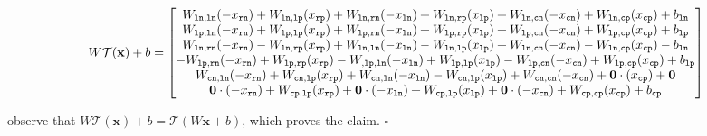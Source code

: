 \documentclass{article}
\begin{document}
$$
W\mathcal{T}(\mathbf{x}) +b = 
\begin{bmatrix}
W_{\tt ln,ln} (-x_{\tt rn}) + W_{\tt ln,lp} (x_{\tt rp}) + W_{\tt ln,rn} (-x_{\tt ln}) + W_{\tt ln,rp} (x_{\tt lp}) + W_{\tt ln,cn} (-x_{\tt cn}) + W_{\tt ln,cp} (x_{\tt cp}) + b_{\tt ln}\\ 
W_{\tt lp,ln} (-x_{\tt rn}) + W_{\tt lp,lp} (x_{\tt rp}) + W_{\tt lp,rn} (-x_{\tt ln}) + W_{\tt lp,rp} (x_{\tt lp}) + W_{\tt lp,cn} (-x_{\tt cn}) + W_{\tt lp,cp} (x_{\tt cp}) + b_{\tt lp}\\ 
W_{\tt ln, rn} (-x_{\tt rn}) - W_{\tt ln, rp} (x_{\tt rp}) + W_{\tt ln,ln} (-x_{\tt ln}) - W_{\tt ln,lp} (x_{\tt lp}) + W_{\tt ln,cn} (-x_{\tt cn}) - W_{\tt ln, cp} (x_{\tt cp}) - b_{\tt ln}\\
-W_{\tt lp,rn} (-x_{\tt rn}) + W_{\tt lp,rp} (x_{\tt rp}) - W_{\tt, lp,ln} (-x_{\tt ln}) + W_{\tt lp,lp} (x_{\tt lp}) - W_{\tt lp, cn} (-x_{\tt cn}) + W_{\tt lp,cp} (x_{\tt cp}) + b_{\tt lp}\\ 
W_{\tt cn,ln} (-x_{\tt rn}) + W_{\tt cn, lp} (x_{\tt rp}) + W_{\tt cn,ln} (-x_{\tt ln}) - W_{\tt cn, lp} (x_{\tt lp}) + W_{\tt cn,cn} (-x_{\tt cn}) + \mathbf{0} \cdot (x_{\tt cp}) + \mathbf{0}\\
 \mathbf{0} \cdot (-x_{\tt rn}) + W_{\tt cp, lp} (x_{\tt rp}) + \mathbf{0} \cdot (-x_{\tt ln}) + W_{\tt cp,lp} (x_{\tt lp}) + \mathbf{0} \cdot (-x_{\tt cn}) + W_{\tt cp,cp} (x_{\tt cp}) + b_{\tt cp}
\end{bmatrix}
$$

observe that $W\mathcal{T}(\mathbf{x}) +b = \mathcal{T}(W\mathbf{x}+b)$, which proves the claim. \hfill $\square$

 
\end{document}
